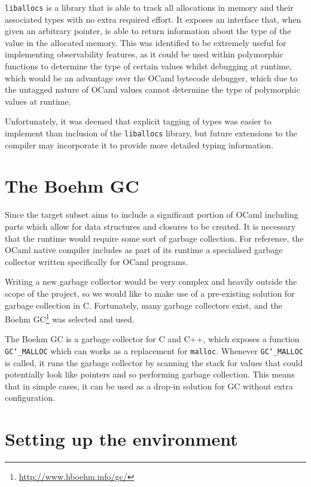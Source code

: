 \documentclass[12pt,a4paper,twoside,openright]{report}
\begin{document}
\texttt{liballocs}\cite{liballocs} is a library that is able to track all
allocations in memory and their associated types with no extra required effort.
It exposes an interface that, when given an arbitrary pointer, is able to return
information about the type of the value in the allocated memory. This was
identified to be extremely useful for implementing observability features, as it
could be used within polymorphic functions to determine the type of certain
values whilst debugging at runtime, which would be an advantage over the OCaml
bytecode debugger, which due to the untagged nature of OCaml values cannot
determine the type of polymorphic values at runtime.

Unfortunately, it was deemed that explicit tagging of types was easier to
implement than inclusion of the \texttt{liballocs} library, but future
extensions to the compiler may incorporate it to provide more detailed typing
information.

\section{The Boehm GC}

Since the target subset aims to include a significant portion of OCaml including
parts which allow for data structures and closures to be created. It is
necessary that the runtime would require some sort of garbage collection. For
reference, the OCaml native compiler includes as part of its runtime a
specialised garbage collector written specifically for OCaml programs.

Writing a new garbage collector would be very complex and heavily outside the
scope of the project, so we would like to make use of a pre-existing solution
for garbage collection in C. Fortunately, many garbage collectors exist, and the
Boehm GC\footnote{\url{http://www.hboehm.info/gc/}} was selected and used.

The Boehm GC is a garbage collector for C and C++, which exposes a function
\texttt{GC\char`_MALLOC} which can works as a replacement for \texttt{malloc}.
Whenever \texttt{GC\char`_MALLOC} is called, it runs the garbage collector by
scanning the stack for values that could potentially look like pointers and so
performing garbage collection. This means that in simple cases, it can be used
as a drop-in solution for GC without extra configuration.

\section{Setting up the environment}
\end{document}
